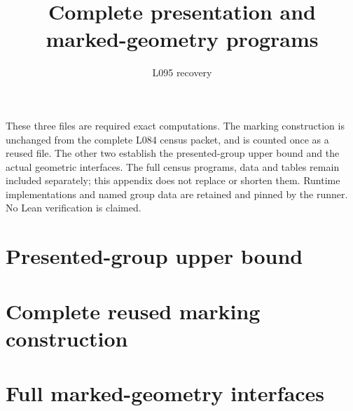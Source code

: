 \documentclass[10pt,a4paper]{article}
\title{Complete presentation and marked-geometry programs}
\author{L095 recovery}\date{}
\begin{document}
\maketitle
These three files are required exact computations. The marking construction is unchanged from the complete L084 census packet, and is counted once as a reused file. The other two establish the presented-group upper bound and the actual geometric interfaces. The full census programs, data and tables remain included separately; this appendix does not replace or shorten them. Runtime implementations and named group data are retained and pinned by the runner. No Lean verification is claimed.
\section*{Presented-group upper bound}
\section*{Complete reused marking construction}
\section*{Full marked-geometry interfaces}
\end{document}
